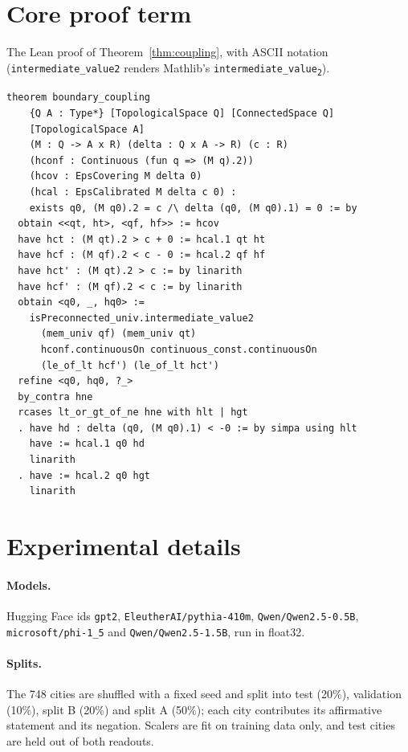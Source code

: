 \documentclass[10pt]{article}
\theoremstyle{definition}
\theoremstyle{remark}
\begin{document}
\section{Core proof term}
\label{app:leanproof}

The Lean proof of Theorem~\ref{thm:coupling}, with ASCII notation
(\texttt{intermediate\_value2} renders Mathlib's
\texttt{intermediate\_value\textsubscript{2}}).

\begin{verbatim}
theorem boundary_coupling
    {Q A : Type*} [TopologicalSpace Q] [ConnectedSpace Q]
    [TopologicalSpace A]
    (M : Q -> A x R) (delta : Q x A -> R) (c : R)
    (hconf : Continuous (fun q => (M q).2))
    (hcov : EpsCovering M delta 0)
    (hcal : EpsCalibrated M delta c 0) :
    exists q0, (M q0).2 = c /\ delta (q0, (M q0).1) = 0 := by
  obtain <<qt, ht>, <qf, hf>> := hcov
  have hct : (M qt).2 > c + 0 := hcal.1 qt ht
  have hcf : (M qf).2 < c - 0 := hcal.2 qf hf
  have hct' : (M qt).2 > c := by linarith
  have hcf' : (M qf).2 < c := by linarith
  obtain <q0, _, hq0> :=
    isPreconnected_univ.intermediate_value2
      (mem_univ qf) (mem_univ qt)
      hconf.continuousOn continuous_const.continuousOn
      (le_of_lt hcf') (le_of_lt hct')
  refine <q0, hq0, ?_>
  by_contra hne
  rcases lt_or_gt_of_ne hne with hlt | hgt
  . have hd : delta (q0, (M q0).1) < -0 := by simpa using hlt
    have := hcal.1 q0 hd
    linarith
  . have := hcal.2 q0 hgt
    linarith
\end{verbatim}

\section{Experimental details}
\label{app:exp}

\paragraph{Models.} Hugging Face ids \texttt{gpt2},
\texttt{EleutherAI/pythia-410m}, \texttt{Qwen/Qwen2.5-0.5B},
\texttt{microsoft/phi-1\_5} and \texttt{Qwen/Qwen2.5-1.5B}, run in
float32.

\paragraph{Splits.} The 748 cities are shuffled with a fixed seed and
split into test (20\%), validation (10\%), split B (20\%) and split A
(50\%); each city contributes its affirmative statement and its
negation. Scalers are fit on training data only, and test cities are
held out of both readouts.
\end{document}
